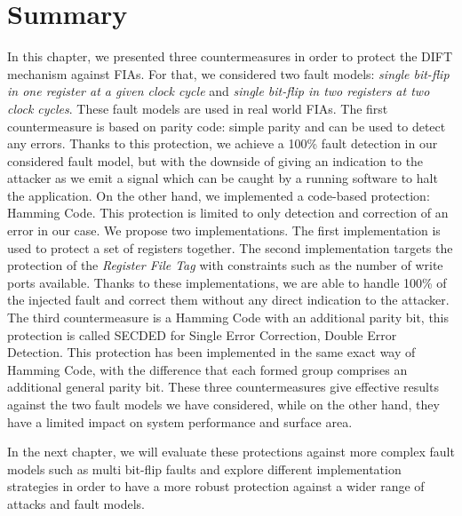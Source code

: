 \section{Summary}
In this chapter, we presented three countermeasures in order to protect the DIFT mechanism against FIAs. For that, we considered two fault models: \textit{single bit-flip in one register at a given clock cycle} and \textit{single bit-flip in two registers at two clock cycles}. These fault models are used in real world FIAs.
The first countermeasure is based on parity code: simple parity and can be used to detect any errors. Thanks to this protection, we achieve a 100\% fault detection in our considered fault model, but with the downside of giving an indication to the attacker as we emit a signal which can be caught by a running software to halt the application.
On the other hand, we implemented a code-based protection: Hamming Code. This protection is limited to only detection and correction of an error in our case. We propose two implementations. The first implementation is used to protect a set of registers together. The second implementation targets the protection of the \textit{Register File Tag} with constraints such as the number of write ports available. Thanks to these implementations, we are able to handle 100\% of the injected fault and correct them without any direct indication to the attacker.
The third countermeasure is a Hamming Code with an additional parity bit, this protection is called SECDED for Single Error Correction, Double Error Detection. This protection has been implemented in the same exact way of Hamming Code, with the difference that each formed group comprises an additional general parity bit.
These three countermeasures give effective results against the two fault models we have considered, while on the other hand, they have a limited impact on system performance and surface area.

In the next chapter, we will evaluate these protections against more complex fault models such as multi bit-flip faults and explore different implementation strategies in order to have a more robust protection against a wider range of attacks and fault models.

